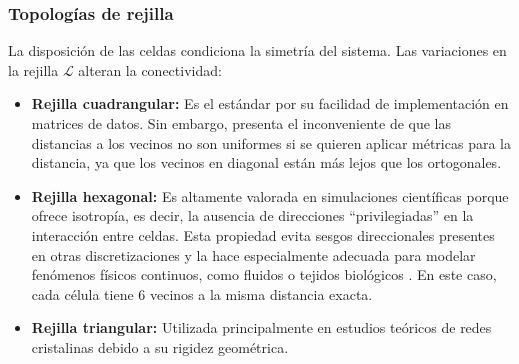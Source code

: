 \documentclass[runningheads]{llncs}
\begin{document}
\subsubsection{Topologías de rejilla}
La disposición de las celdas condiciona la simetría del sistema. Las variaciones en la rejilla $\mathcal{L}$ alteran la conectividad:
\begin{itemize}
    \item \textbf{Rejilla cuadrangular:} Es el estándar por su facilidad de implementación en matrices de datos. Sin embargo, presenta el inconveniente de que las distancias a los vecinos no son uniformes si se quieren aplicar métricas para la distancia, ya que los vecinos en diagonal están más lejos que los ortogonales.
    \item \textbf{Rejilla hexagonal:} Es altamente valorada en simulaciones científicas porque ofrece isotropía, es decir, la ausencia de direcciones ``privilegiadas'' en la interacción entre celdas. Esta propiedad evita sesgos direccionales presentes en otras discretizaciones y la hace especialmente adecuada para modelar fenómenos físicos continuos, como fluidos o tejidos biológicos \cite{ref_wolfram, ref_lattice_gas}. En este caso, cada célula tiene 6 vecinos a la misma distancia exacta.
    \item \textbf{Rejilla triangular:} Utilizada principalmente en estudios teóricos de redes cristalinas \cite{ref_triangular, ref_triautomata} debido a su rigidez geométrica.
\end{itemize}
\end{document}
